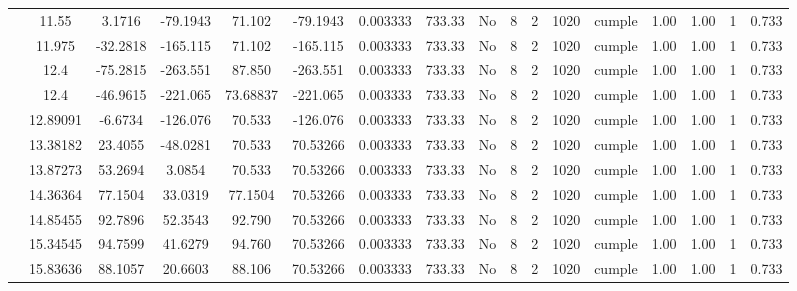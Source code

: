 \begin{table}[H]
{\begin{tabular}{|c|c|c|c|c|c|c|c|c|c|c|c|c|c|c|c|c|}
\cline{2-17}    & 11.55 & 3.1716 & -79.1943 & 71.102 & -79.1943 & 0.003333 & 733.33 & No  & 8   & 2   & 1020 & \cellcolor[rgb]{ .776,  .937,  .808}cumple & 1.00 & 1.00 & 1   & 0.733 \bigstrut\\
\cline{2-17}    & 11.975 & -32.2818 & -165.115 & 71.102 & -165.115 & 0.003333 & 733.33 & No  & 8   & 2   & 1020 & \cellcolor[rgb]{ .776,  .937,  .808}cumple & 1.00 & 1.00 & 1   & 0.733 \bigstrut\\
\cline{2-17}    & \cellcolor[rgb]{ .851,  .882,  .949}12.4 & -75.2815 & -263.551 & 87.850 & -263.551 & 0.003333 & 733.33 & No  & 8   & 2   & 1020 & \cellcolor[rgb]{ .776,  .937,  .808}cumple & 1.00 & 1.00 & 1   & 0.733 \bigstrut\\
\cline{2-17}    & \cellcolor[rgb]{ .851,  .882,  .949}12.4 & -46.9615 & -221.065 & 73.68837 & -221.065 & 0.003333 & 733.33 & No  & 8   & 2   & 1020 & \cellcolor[rgb]{ .776,  .937,  .808}cumple & 1.00 & 1.00 & 1   & 0.733 \bigstrut\\
\cline{2-17}    & 12.89091 & -6.6734 & -126.076 & 70.533 & -126.076 & 0.003333 & 733.33 & No  & 8   & 2   & 1020 & \cellcolor[rgb]{ .776,  .937,  .808}cumple & 1.00 & 1.00 & 1   & 0.733 \bigstrut\\
\cline{2-17}    & 13.38182 & 23.4055 & -48.0281 & 70.533 & 70.53266 & 0.003333 & 733.33 & No  & 8   & 2   & 1020 & \cellcolor[rgb]{ .776,  .937,  .808}cumple & 1.00 & 1.00 & 1   & 0.733 \bigstrut\\
\cline{2-17}    & 13.87273 & 53.2694 & 3.0854 & 70.533 & 70.53266 & 0.003333 & 733.33 & No  & 8   & 2   & 1020 & \cellcolor[rgb]{ .776,  .937,  .808}cumple & 1.00 & 1.00 & 1   & 0.733 \bigstrut\\
\cline{2-17}    & 14.36364 & 77.1504 & 33.0319 & 77.1504 & 70.53266 & 0.003333 & 733.33 & No  & 8   & 2   & 1020 & \cellcolor[rgb]{ .776,  .937,  .808}cumple & 1.00 & 1.00 & 1   & 0.733 \bigstrut\\
\cline{2-17}    & 14.85455 & 92.7896 & 52.3543 & 92.790 & 70.53266 & 0.003333 & 733.33 & No  & 8   & 2   & 1020 & \cellcolor[rgb]{ .776,  .937,  .808}cumple & 1.00 & 1.00 & 1   & 0.733 \bigstrut\\
\cline{2-17}    & 15.34545 & 94.7599 & 41.6279 & 94.760 & 70.53266 & 0.003333 & 733.33 & No  & 8   & 2   & 1020 & \cellcolor[rgb]{ .776,  .937,  .808}cumple & 1.00 & 1.00 & 1   & 0.733 \bigstrut\\
\cline{2-17}    & 15.83636 & 88.1057 & 20.6603 & 88.106 & 70.53266 & 0.003333 & 733.33 & No  & 8   & 2   & 1020 & \cellcolor[rgb]{ .776,  .937,  .808}cumple & 1.00 & 1.00 & 1   & 0.733 \bigstrut\\

\end{tabular}}
\end{table}
